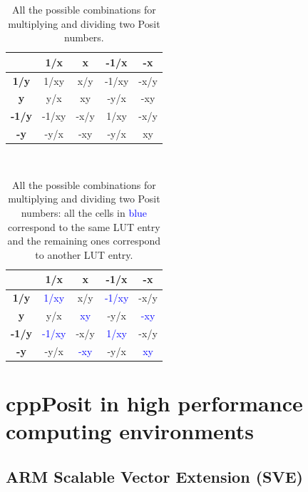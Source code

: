 \begin{table}[]
\centering
\caption{All the possible combinations for multiplying and dividing two Posit numbers.}
\label{tab:tab_mul_full}
\begin{tabular}{ccccc}
\hline
\textbf{}     & \textbf{1/x} & \textbf{x} & \textbf{-1/x} & \textbf{-x} \\ \hline
\textbf{1/y}  & 1/xy         & x/y        & -1/xy         & -x/y        \\ \hline
\textbf{y}    & y/x          & xy         & -y/x          & -xy         \\ \hline
\textbf{-1/y} & -1/xy        & -x/y       & 1/xy          & -x/y        \\ \hline
\textbf{-y}   & -y/x         & -xy        & -y/x          & xy          \\ \hline
\end{tabular}
\end{table}

\begin{table}[]
\centering
\caption{All the possible combinations for multiplying and dividing two Posit numbers: all the cells in \textcolor{blue}{blue} correspond to the same LUT entry and the remaining ones correspond to another LUT entry.} \
\label{tab:tab_mul_color}
\begin{tabular}{ccccc}
\hline
\textbf{}     & \textbf{1/x} & \textbf{x} & \textbf{-1/x} & \textbf{-x} \\ \hline
\textbf{1/y}  & \textcolor{blue}{1/xy}         & x/y        & \textcolor{blue}{-1/xy}         & -x/y        \\ \hline
\textbf{y}    & y/x          & \textcolor{blue}{xy}         & -y/x          & \textcolor{blue}{-xy}         \\ \hline
\textbf{-1/y} & \textcolor{blue}{-1/xy}        & -x/y       & \textcolor{blue}{1/xy }         & -x/y        \\ \hline
\textbf{-y}   & -y/x         &\textcolor{blue}{ -xy}        & -y/x          & \textcolor{blue}{xy}          \\ \hline
\end{tabular}
\end{table}

\section{cppPosit in high performance computing environments}

\subsection{ARM Scalable Vector Extension (SVE)}

